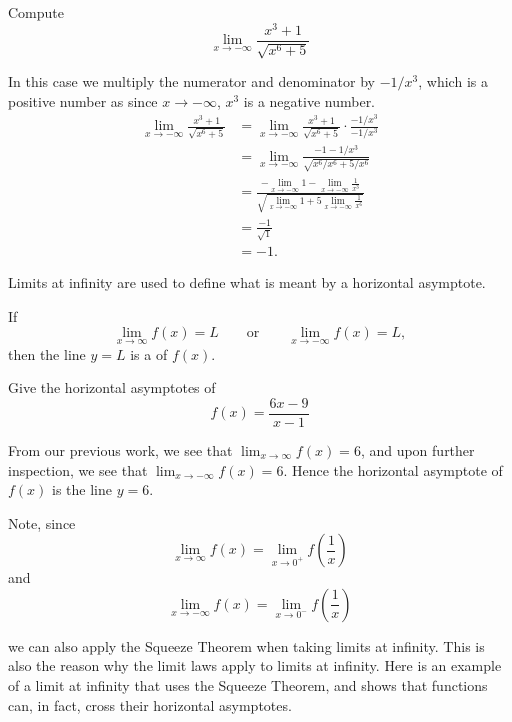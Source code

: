 \documentclass{ximera}
\begin{document}
\begin{example}
Compute
\[
\lim_{x\to -\infty} \frac{x^3+1}{\sqrt{x^6+5}}
\]
\begin{explanation}
In this case we multiply the numerator and denominator by $-1/x^3$,
which is a positive number as since $x\to -\infty$, $x^3$ is a negative
number.
\begin{align*}
\lim_{x\to -\infty} \frac{x^3+1}{\sqrt{x^6+5}} &= \lim_{x\to -\infty} \frac{x^3+1}{\sqrt{x^6+5}} \cdot \frac{-1/x^3}{-1/x^3}\\
&= \lim_{x\to -\infty} \frac{-1-1/x^3}{\sqrt{x^6/x^6+5/x^6}}\\
&= \frac{-\displaystyle\lim_{x\to -\infty} 1 - \displaystyle\lim_{x\to -\infty} \frac{1}{x^3}}{\sqrt{\displaystyle\lim_{x\to -\infty} 1 + 5\displaystyle\lim_{x\to -\infty} \frac{1}{x^6}}} \\
&= \frac{-1}{\sqrt{1}} \\
&= -1.
\end{align*}
\end{explanation}
\end{example}

Limits at infinity are used to define what is meant by a horizontal asymptote.

\begin{definition}
\label{def:horizasymptote}
If  
\[
\lim_{x\to \infty} f(x) = L \qquad\text{or}\qquad \lim_{x\to -\infty} f(x) = L,
\]
then the line $y=L$ is a  of $f(x)$.
\end{definition}

\begin{example} 
Give the horizontal asymptotes of
\[
f(x) = \frac{6x-9}{x-1}
\]
\begin{explanation}
From our previous work, we see that $\displaystyle\lim_{x\to \infty} f(x) = 6$, and
upon further inspection, we see that $\displaystyle\lim_{x\to -\infty} f(x) =
6$. Hence the horizontal asymptote of $f(x)$ is the line $y=6$.
\end{explanation}
\end{example}

Note, since
\[
\lim_{x\to \infty} f(x) = \lim_{x\to 0^+} f\left(\frac{1}{x}\right)
\]
and
\[
\lim_{x\to -\infty} f(x) = \lim_{x\to 0^-} f\left(\frac{1}{x}\right)
\]

we can also apply the Squeeze Theorem when taking limits at infinity.  This is also the reason why the limit laws apply to limits at infinity.
Here is an example of a limit at infinity that uses the Squeeze
Theorem, and shows that functions can, in fact, cross their horizontal
asymptotes.
\end{document}
